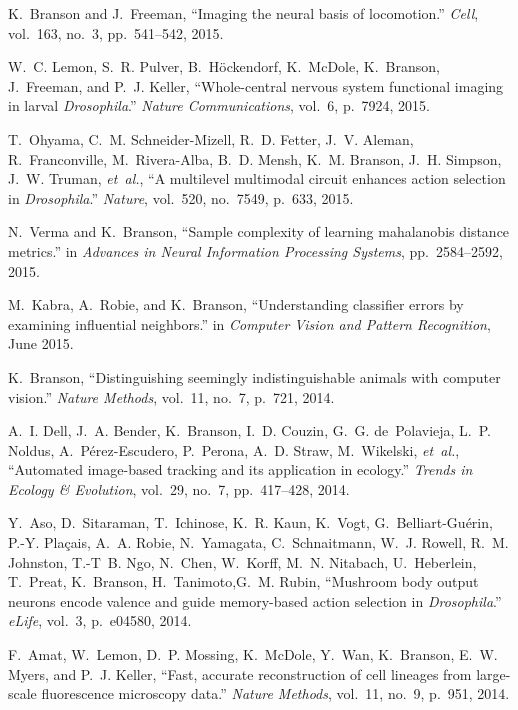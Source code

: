 \begin{cvenum}
\item K.~Branson and J.~Freeman, ``Imaging the neural basis of locomotion.'' {\em
  Cell}, vol.~163, no.~3, pp.~541--542, 2015.

\item W.~C. Lemon, S.~R. Pulver, B.~H{\"o}ckendorf, K.~McDole, K.~Branson,
  J.~Freeman, and P.~J. Keller, ``Whole-central nervous system functional
  imaging in larval {\em {{D}}rosophila}.'' {\em Nature Communications}, vol.~6, p.~7924,
  2015.

\item T.~Ohyama, C.~M. Schneider-Mizell, R.~D. Fetter, J.~V. Aleman, R.~Franconville, M.~Rivera-Alba, B.~D. Mensh, K.~M. Branson, J.~H. Simpson, J.~W. Truman, {\em et~al.}, ``A multilevel multimodal circuit enhances action selection in {\em {{D}}rosophila}.'' {\em Nature}, vol.~520, no.~7549, p.~633, 2015.

\item N.~Verma and K.~Branson, ``Sample complexity of learning mahalanobis distance metrics.'' in {\em Advances in Neural Information Processing Systems}, pp.~2584--2592, 2015.

\item M.~Kabra, A.~Robie, and K.~Branson, ``Understanding classifier errors by
  examining influential neighbors.'' in {\em Computer Vision and Pattern
  Recognition}, June 2015.

\item K.~Branson, ``Distinguishing seemingly indistinguishable animals with computer
  vision.'' {\em Nature Methods}, vol.~11, no.~7, p.~721, 2014.

\item A.~I. Dell, J.~A. Bender, K.~Branson, I.~D. Couzin, G.~G. de~Polavieja, L.~P.
  Noldus, A.~P{\'e}rez-Escudero, P.~Perona, A.~D. Straw, M.~Wikelski, {\em
  et~al.}, ``Automated image-based tracking and its application in ecology.''
  {\em Trends in Ecology \& Evolution}, vol.~29, no.~7, pp.~417--428, 2014.

  \item Y.~Aso, D.~Sitaraman, T.~Ichinose, K.~R. Kaun, K.~Vogt, G.~Belliart-Gu{\'e}rin, P.-Y. Pla{\c{c}}ais, A.~A. Robie, N.~Yamagata, C.~Schnaitmann, W.~J. Rowell, R.~M. Johnston, T.-T~B. Ngo, N.~Chen, W.~Korff, M.~N. Nitabach, U.~Heberlein, T.~Preat, K.~Branson, H.~Tanimoto,G.~M. Rubin,  ``Mushroom body output neurons encode valence and guide memory-based action selection in {\em {{D}}rosophila}.'' {\em eLife}, vol.~3, p.~e04580, 2014.

\item F.~Amat, W.~Lemon, D.~P. Mossing, K.~McDole, Y.~Wan, K.~Branson, E.~W. Myers,
  and P.~J. Keller, ``Fast, accurate reconstruction of cell lineages from
  large-scale fluorescence microscopy data.'' {\em Nature Methods}, vol.~11,
  no.~9, p.~951, 2014.


\end{cvenum}
